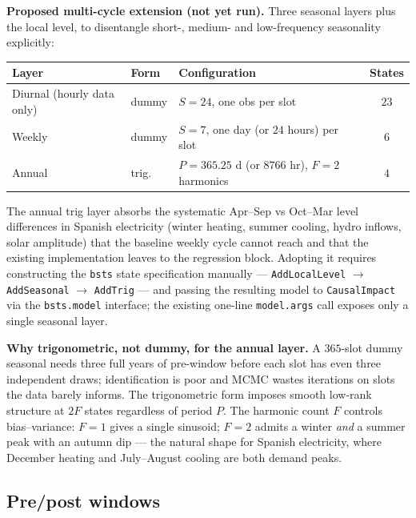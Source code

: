 \documentclass[11pt,a4paper]{article}
\begin{document}
\medskip
\noindent\textbf{Proposed multi-cycle extension (not yet run).} Three seasonal layers plus the local level, to disentangle short-, medium- and low-frequency seasonality explicitly:
\begin{center}
\renewcommand{\arraystretch}{1.2}
\setlength{\tabcolsep}{8pt}
\footnotesize
\begin{tabular}{l l l c}
\toprule
\textbf{Layer} & \textbf{Form} & \textbf{Configuration} & \textbf{States} \\
\midrule
Diurnal (hourly data only) & dummy & $S = 24$, one obs per slot                & $23$ \\
Weekly                     & dummy & $S = 7$, one day (or $24$ hours) per slot & $6$  \\
Annual                     & trig. & $P = 365.25$ d (or $8766$ hr), $F = 2$ harmonics & $4$ \\
\bottomrule
\end{tabular}
\end{center}
The annual trig layer absorbs the systematic Apr--Sep vs Oct--Mar level differences in Spanish electricity (winter heating, summer cooling, hydro inflows, solar amplitude) that the baseline weekly cycle cannot reach and that the existing implementation leaves to the regression block. Adopting it requires constructing the \texttt{bsts} state specification manually --- \texttt{AddLocalLevel} $\to$ \texttt{AddSeasonal} $\to$ \texttt{AddTrig} --- and passing the resulting model to \texttt{CausalImpact} via the \texttt{bsts.model} interface; the existing one-line \texttt{model.args} call exposes only a single seasonal layer.

\medskip
\noindent\textbf{Why trigonometric, not dummy, for the annual layer.} A $365$-slot dummy seasonal needs three full years of pre-window before each slot has even three independent draws; identification is poor and MCMC wastes iterations on slots the data barely informs. The trigonometric form imposes smooth low-rank structure at $2F$ states regardless of period $P$. The harmonic count $F$ controls bias--variance: $F = 1$ gives a single sinusoid; $F = 2$ admits a winter \emph{and} a summer peak with an autumn dip --- the natural shape for Spanish electricity, where December heating and July--August cooling are both demand peaks.

\subsection*{Pre/post windows}
\end{document}
